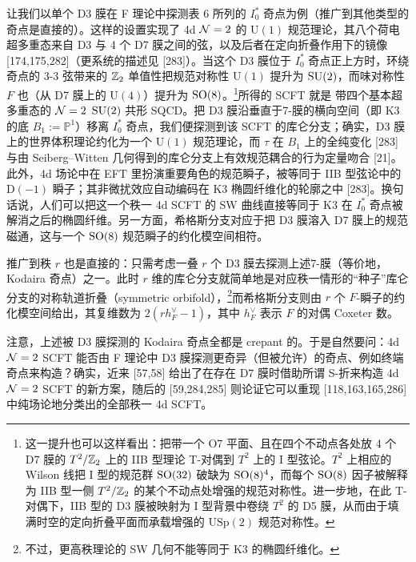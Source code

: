 让我们以单个 D3 膜在 F 理论中探测表 6 所列的 $I_0^*$ 奇点为例（推广到其他类型的奇点是直接的）。这样的设置实现了 4d $\mathcal{N}=2$ 的 $\mathrm{U}(1)$ 规范理论，其八个荷电超多重态来自 D3 与 4 个 D7 膜之间的弦，以及后者在定向折叠作用下的镜像 [174,175,282]（更系统的描述见 [283]）。当这个 D3 膜位于 $I_0^*$ 奇点正上方时，环绕奇点的 3-3 弦带来的 $\mathbb{Z}_2$ 单值性把规范对称性 $\mathrm{U}(1)$ 提升为 $\mathrm{SU}(2)$，而味对称性 $F$ 也（从 D7 膜上的 $\mathrm{U}(4)$）提升为 $\mathrm{SO}(8)$。\footnote{这一提升也可以这样看出：把带一个 O7 平面、且在四个不动点各处放 4 个 D7 膜的 $T^2/\mathbb{Z}_2$ 上的 IIB 型理论 T-对偶到 $T^2$ 上的 I 型弦论。$T^2$ 上相应的 Wilson 线把 I 型的规范群 $\mathrm{SO}(32)$ 破缺为 $\mathrm{SO}(8)^4$，而每个 $\mathrm{SO}(8)$ 因子被解释为 IIB 型一侧 $T^2/\mathbb{Z}_2$ 的某个不动点处增强的规范对称性。进一步地，在此 T-对偶下，IIB 型的 D3 膜被映射为 I 型背景中卷绕 $T^2$ 的 D5 膜，从而由于填满时空的定向折叠平面而承载增强的 $\mathrm{USp}(2)$ 规范对称性。}所得的 SCFT 就是
带四个基本超多重态的 $\mathcal{N}=2$ $\mathrm{SU}(2)$ 共形 SQCD。把 D3 膜沿垂直于7-膜的横向空间（即 K3 的底 $B_1:=\mathbb{P}^1$）移离 $I_0^*$ 奇点，我们便探测到该 SCFT 的库仑分支；确实，D3 膜上的世界体积理论约化为一个 $\mathrm{U}(1)$ 规范理论，而 $\tau$ 在 $B_1$ 上的全纯变化 [283] 与由 Seiberg--Witten 几何得到的库仑分支上有效规范耦合的行为定量吻合 [21]。此外，4d 场论中在 EFT 里扮演重要角色的规范瞬子，被等同于 IIB 型弦论中的 D$(-1)$ 瞬子；其非微扰效应自动编码在 K3 椭圆纤维化的轮廓之中 [283]。换句话说，人们可以把这一个秩一 4d SCFT 的 SW 曲线直接等同于 K3 在 $I_0^*$ 奇点被解消之后的椭圆纤维。另一方面，希格斯分支对应于把 D3 膜溶入 D7 膜上的规范磁通，这与一个 $\mathrm{SO}(8)$ 规范瞬子的约化模空间相符。

推广到秩 $r$ 也是直接的：只需考虑一叠 $r$ 个 D3 膜去探测上述7-膜（等价地，Kodaira 奇点）之一。此时 $r$ 维的库仑分支就简单地是对应秩一情形的“种子”库仑分支的对称轨道折叠（symmetric orbifold），\footnote{不过，更高秩理论的 SW 几何不能等同于 K3 的椭圆纤维化。}而希格斯分支则由 $r$ 个 $F$-瞬子的约化模空间给出，其复维数为 $2(rh_F^\vee-1)$，其中 $h_F^\vee$ 表示 $F$ 的对偶 Coxeter 数。


注意，上述被 D3 膜探测的 Kodaira 奇点全都是 crepant 的。于是自然要问：4d $\mathcal{N}=2$ SCFT 能否由 F 理论中 D3 膜探测更奇异（但被允许）的奇点、例如终端奇点来构造？确实，近来 [57,58] 给出了在存在 D7 膜时借助所谓 S-折来构造 4d $\mathcal{N}=2$ SCFT 的新方案，随后的 [59,284,285] 则论证它可以重现 [118,163,165,286] 中纯场论地分类出的全部秩一 4d SCFT。

